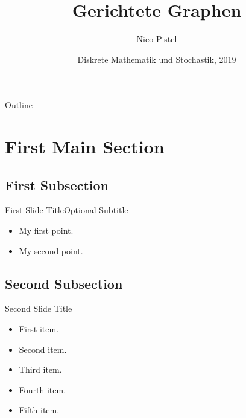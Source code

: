 \documentclass[mathserif]{beamer}
\title{Gerichtete Graphen}
\author{Nico Pistel}
\institute[Institute] %
{
    Fachbereich Wirtschaft und Informationstechnik\\
    Westfälische Hochschule Bocholt
}
\date{Diskrete Mathematik und Stochastik, 2019}
\begin{document}
\begin{frame}
    \titlepage
\end{frame}

\begin{frame}{Outline}
    \tableofcontents
\end{frame}

\section{First Main Section}

\subsection{First Subsection}

\begin{frame}{First Slide Title}{Optional Subtitle}
    \begin{itemize}
    \item {
        My first point.
    }
    \item {
        My second point.
    }
    \end{itemize}
\end{frame}

\subsection{Second Subsection}

\begin{frame}{Second Slide Title}
    \begin{itemize}
    \item {
        First item.
        \pause %
    }
    \item {
        Second item.
    }
    \item<3-> {
        Third item.
    }
    \item<4-> {
        Fourth item.
    }
    \item<5-> {
        Fifth item. 
    }
    \end{itemize}
\end{frame}
\end{document}
